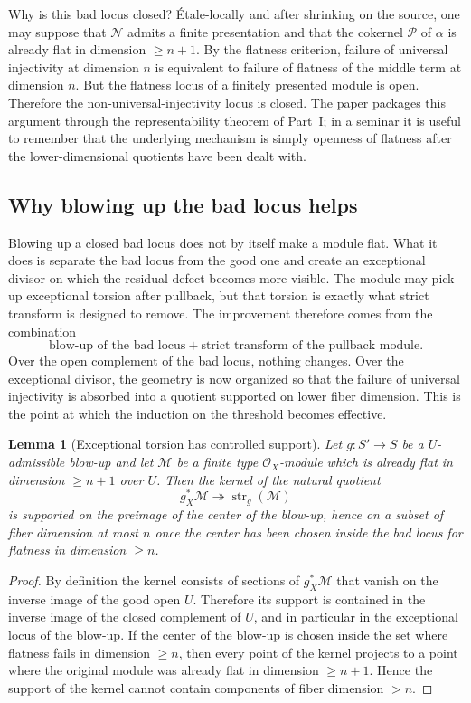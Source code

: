 \documentclass[11pt,oneside]{article}
\newtheorem{lemma}[theorem]{Lemma}
\newcommand{\M}{\mathcal M}
\newcommand{\N}{\mathcal N}
\newcommand{\Pcal}{\mathcal P}
\newcommand{\OO}{\mathcal O}
\newcommand{\st}{\operatorname{str}}
\begin{document}
Why is this bad locus closed?  Étale-locally and after shrinking on the source, one may suppose that $\N$ admits a finite presentation and that the cokernel $\Pcal$ of $\alpha$ is already flat in dimension $\ge n+1$.  By the flatness criterion, failure of universal injectivity at dimension $n$ is equivalent to failure of flatness of the middle term at dimension $n$.  But the flatness locus of a finitely presented module is open.  Therefore the non-universal-injectivity locus is closed.  The paper packages this argument through the representability theorem of Part~I; in a seminar it is useful to remember that the underlying mechanism is simply openness of flatness after the lower-dimensional quotients have been dealt with.

\subsection{Why blowing up the bad locus helps}

Blowing up a closed bad locus does not by itself make a module flat.  What it does is separate the bad locus from the good one and create an exceptional divisor on which the residual defect becomes more visible.  The module may pick up exceptional torsion after pullback, but that torsion is exactly what strict transform is designed to remove.  The improvement therefore comes from the combination
\[
\text{blow-up of the bad locus} + \text{strict transform of the pullback module}.
\]
Over the open complement of the bad locus, nothing changes.  Over the exceptional divisor, the geometry is now organized so that the failure of universal injectivity is absorbed into a quotient supported on lower fiber dimension.  This is the point at which the induction on the threshold becomes effective.

\begin{lemma}[Exceptional torsion has controlled support]\label{lem:exceptional-torsion-controlled}
Let $g\colon S'\to S$ be a $U$-admissible blow-up and let $\M$ be a finite type $\OO_X$-module which is already flat in dimension $\ge n+1$ over $U$.  Then the kernel of the natural quotient
\[
g_X^*\M\twoheadrightarrow \st_g(\M)
\]
is supported on the preimage of the center of the blow-up, hence on a subset of fiber dimension at most $n$ once the center has been chosen inside the bad locus for flatness in dimension $\ge n$.
\end{lemma}

\begin{proof}
By definition the kernel consists of sections of $g_X^*\M$ that vanish on the inverse image of the good open $U$.  Therefore its support is contained in the inverse image of the closed complement of $U$, and in particular in the exceptional locus of the blow-up.  If the center of the blow-up is chosen inside the set where flatness fails in dimension $\ge n$, then every point of the kernel projects to a point where the original module was already flat in dimension $\ge n+1$.  Hence the support of the kernel cannot contain components of fiber dimension $>n$.
\end{proof}
\end{document}

